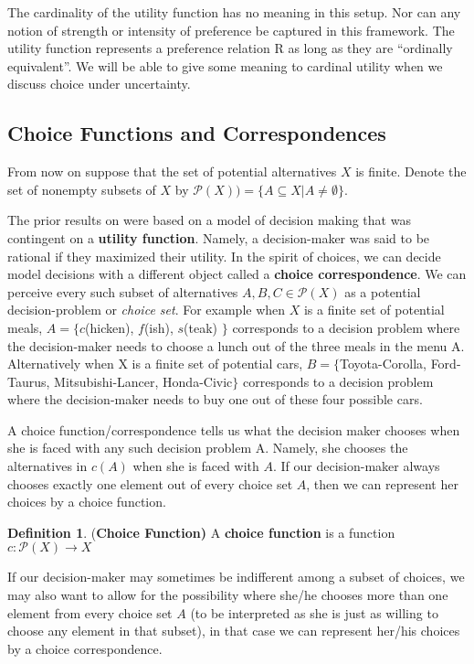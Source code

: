 \documentclass[12pt]{article}
\theoremstyle{plain}
\theoremstyle{definition}
\newtheorem{defin}{Definition}[subsection]
\theoremstyle{remark}
\newcommand{\tn}[1]{\textnormal{#1}}
\newcommand{\pp}[1]{\mathcal{P}(#1)}
\newcommand{\3}{\vspace*{3mm}}
\newcommand{\name}[1]{\tn{(\textbf{#1)}}}
\newcommand{\es}{\emptyset}
\begin{document}
The cardinality of the utility function has no meaning in this setup. Nor can any notion of strength or intensity of preference be captured in this framework. The utility function represents a preference relation R as long as they are “ordinally equivalent”. We will be able to give some meaning to cardinal utility when we discuss choice under uncertainty.

\subsection{Choice Functions and Correspondences}

 From now on suppose that the set of potential alternatives $X$ is finite. Denote the set of nonempty subsets of $X$ by $\pp{X)} = \{A \subseteq X | A \neq \es\}$. 

\quad The prior results on were based on a model of decision making that was contingent on a \textbf{utility function}. Namely, a decision-maker was said to be rational if they maximized their utility. In the spirit of choices, we can decide model decisions with a different object called a \textbf{choice correspondence}. We can perceive every such subset of alternatives $A, B, C \in \pp{X}$ as a potential decision-problem or \emph{choice set}. For example when $X$ is a finite set of potential meals, $A = \{$\tn{$c$(hicken), $f$(ish), $s$(teak)} $\}$ corresponds to a decision problem where the decision-maker needs to choose a lunch out of the three meals in the menu A. Alternatively when X is a finite set of potential cars, $B =\{$Toyota-Corolla, Ford-Taurus, Mitsubishi-Lancer, Honda-Civic$\}$ corresponds to a decision problem where the decision-maker needs to buy one out of these four possible cars. 


\quad A choice function/correspondence tells us what the decision maker chooses when she is faced with any such decision problem A. Namely, she chooses the alternatives in $c(A)$ when she is faced with $A$. If our decision-maker always chooses exactly one element out of every choice set $A$, then we can represent her choices by a choice function.

\begin{defin} \name{Choice Function} A \textbf{choice function} is a function $c: \pp{X} \to X$
\end{defin}

If our decision-maker may sometimes be indifferent among a subset of choices, we may also want to allow for the possibility where she/he chooses more than one element from every choice set $A$ (to be interpreted as she is just as willing to choose any element in that subset), in that case we can represent her/his choices by a choice correspondence. 
\end{document}
